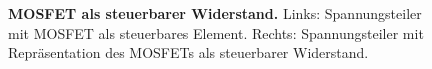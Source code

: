 {\begin{figure}[H]
    \caption{\textbf{MOSFET als steuerbarer Widerstand.} Links: Spannungsteiler mit MOSFET als steuerbares Element. Rechts: 
    Spannungsteiler mit Repräsentation des MOSFETs als steuerbarer Widerstand. }  
    \label{fig:MOSFETAlsSteuerbarerWiderstand}
\end{figure}}






